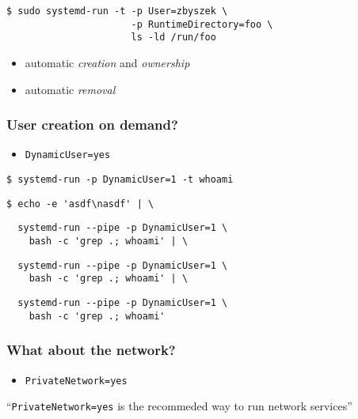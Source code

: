 \documentclass[serif]{beamer}
\begin{document}
\begin{frame}[fragile]
  \begin{verbatim}
$ sudo systemd-run -t -p User=zbyszek \
                      -p RuntimeDirectory=foo \
                      ls -ld /run/foo
  \end{verbatim}

  \begin{itemize}
  \item automatic \textit{creation} and \textit{ownership}
  \item automatic \textit{removal}
  \end{itemize}
\end{frame}

\begin{frame}[fragile]
  \frametitle{User creation on demand?}
  \pause
  \begin{itemize}
  \item \texttt{DynamicUser=yes}
  \end{itemize}

  \pause

  \begin{verbatim}
$ systemd-run -p DynamicUser=1 -t whoami
  \end{verbatim}

  \pause

  \begin{verbatim}
$ echo -e 'asdf\nasdf' | \
  \end{verbatim}
  \pause
  \begin{verbatim}
  systemd-run --pipe -p DynamicUser=1 \
    bash -c 'grep .; whoami' | \
  \end{verbatim}
  \pause
  \begin{verbatim}
  systemd-run --pipe -p DynamicUser=1 \
    bash -c 'grep .; whoami' | \
  \end{verbatim}
  \pause
  \begin{verbatim}
  systemd-run --pipe -p DynamicUser=1 \
    bash -c 'grep .; whoami'
  \end{verbatim}
\end{frame}

\begin{frame}
  \frametitle{What about the network?}

  \pause

  \begin{itemize}
  \item \texttt{PrivateNetwork=yes}
  \end{itemize}

  \pause

  ``\texttt{PrivateNetwork=yes} is the recommeded way to run network services''
\end{frame}
\end{document}
